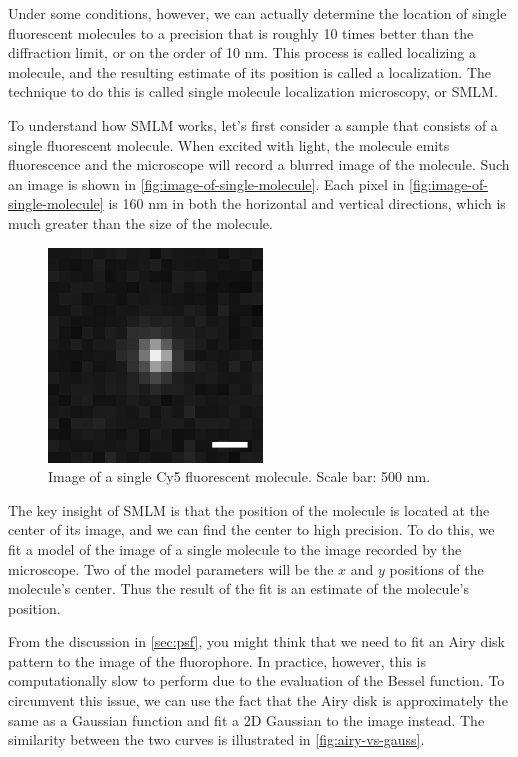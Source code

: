 \documentclass[10pt,a4paper,oneside]{book}
\begin{document}
Under some conditions, however, we can actually determine the location of single fluorescent molecules to a precision that is roughly 10 times better than the diffraction limit, or on the order of 10 nm. This process is called localizing a molecule, and the resulting estimate of its position is called a localization. The technique to do this is called single molecule localization microscopy, or SMLM.

To understand how SMLM works, let's first consider a sample that consists of a single fluorescent molecule. When excited with light, the molecule emits fluorescence and the microscope will record a blurred image of the molecule. Such an image is shown in \autoref{fig:image-of-single-molecule}. Each pixel in \autoref{fig:image-of-single-molecule} is 160 nm in both the horizontal and vertical directions, which is much greater than the size of the molecule.

\begin{figure}[ht]
    \centering
    \includegraphics{image-of-single-molecule.png}
    \caption{Image of a single Cy5 fluorescent molecule. Scale bar: 500 nm.}
    \label{fig:image-of-single-molecule}
\end{figure}

The key insight of SMLM is that the position of the molecule is located at the center of its image, and we can find the center to high precision. To do this, we fit a model of the image of a single molecule to the image recorded by the microscope. Two of the model parameters will be the $x$ and $y$ positions of the molecule's center. Thus the result of the fit is an estimate of the molecule's position.

From the discussion in \autoref{sec:psf}, you might think that we need to fit an Airy disk pattern to the image of the fluorophore. In practice, however, this is computationally slow to perform due to the evaluation of the Bessel function. To circumvent this issue, we can use the fact that the Airy disk is approximately the same as a Gaussian function and fit a 2D Gaussian to the image instead. The similarity between the two curves is illustrated in \autoref{fig:airy-vs-gauss}.
\end{document}
